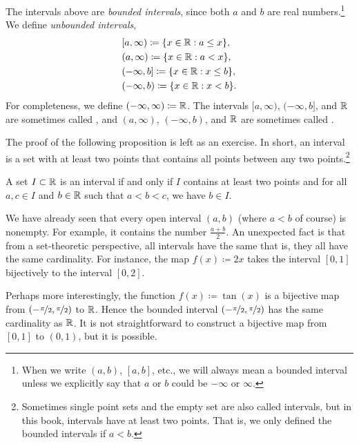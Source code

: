The intervals above are \emph{bounded intervals}, since both $a$ and $b$ are real numbers.\footnote{When we write
$(a,b)$, $[a,b]$, etc., we will always mean a bounded interval unless we explicitly say
that $a$ or $b$ could be $-\infty$ or $\infty$.}
We define \emph{unbounded intervals},
\begin{align*}
& [a,\infty) \coloneqq \{ x \in {\mathbb{R}} : a \leq x \}, \\
& (a,\infty) \coloneqq \{ x \in {\mathbb{R}} : a < x \}, \\
& (-\infty,b] \coloneqq \{ x \in {\mathbb{R}} : x \leq b \}, \\
& (-\infty,b) \coloneqq \{ x \in {\mathbb{R}} : x < b \} .
\end{align*}
For completeness, we define $(-\infty,\infty) \coloneqq {\mathbb{R}}$.
The intervals $[a,\infty)$, $(-\infty,b]$, and ${\mathbb{R}}$ are sometimes called
\emph{},
and $(a,\infty)$, $(-\infty,b)$, and ${\mathbb{R}}$ are sometimes called
\emph{}.

The proof of the following proposition is left as an exercise.
In short, an interval is a set with at least two points
that contains all points between any two
points.\footnote{Sometimes single point sets and the empty set are
also called intervals, but in this book, intervals have at least two points.
That is, we only defined the bounded intervals if $a < b$.}

\begin{prop} \label{prop:intervaldef}
A set $I \subset {\mathbb{R}}$ is an interval if and only if
$I$ contains at least two points and
for all $a,c \in I$ and $b \in {\mathbb{R}}$ such that $a < b < c$, we have $b \in I$.
\end{prop}

We have already seen that every open interval $(a,b)$ (where $a < b$ of course)
is nonempty.  For example, it contains the number $\frac{a+b}{2}$.
An unexpected fact is that from a set-theoretic perspective,
all intervals have the same  that is, they all have
the same cardinality.  For instance, the map $f(x) \coloneqq 2x$
takes the interval $[0,1]$ bijectively to the interval $[0,2]$.

Perhaps more interestingly,
the function $f(x) \coloneqq \tan(x)$
is a bijective map from $(-\nicefrac{\pi}{2},\nicefrac{\pi}{2})$ to ${\mathbb{R}}$.  Hence the bounded
interval $(-\nicefrac{\pi}{2},\nicefrac{\pi}{2})$ has the same cardinality as ${\mathbb{R}}$.  It is not
straightforward to construct a bijective map from $[0,1]$ to
$(0,1)$, but it is possible.

